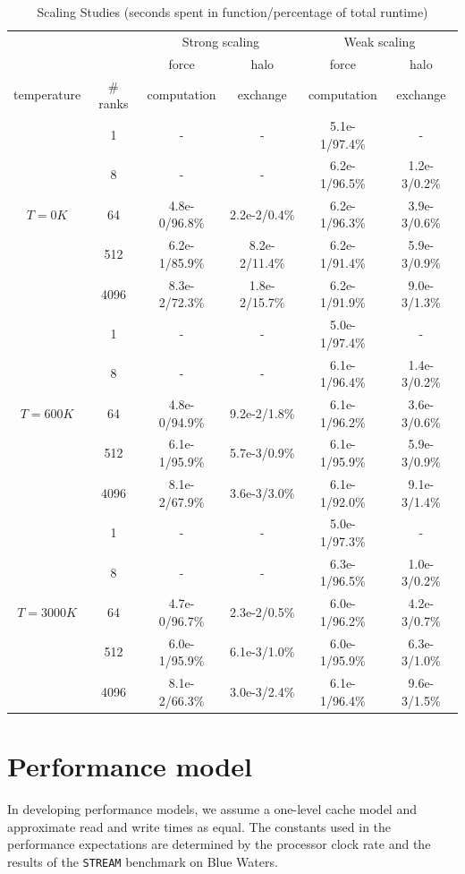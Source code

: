 \documentclass[12pt]{article}
\begin{document}
\begin{table}[h!]
\centering
\begin{tabular}{c c | c c | c c}
\toprule
& \multicolumn{1}{c}{} & \multicolumn{2}{c}{Strong scaling} & \multicolumn{2}{c}{Weak scaling} \\
\cmidrule(r){3-4} \cmidrule(r){5-6}
\multicolumn{1}{c}{} & \multicolumn{1}{c}{}  & \multicolumn{1}{c}{force} & \multicolumn{1}{c}{halo} & \multicolumn{1}{c}{force} & \multicolumn{1}{c}{halo} \\
\multicolumn{1}{c}{temperature} & \multicolumn{1}{c}{\# ranks} & \multicolumn{1}{c}{computation} & \multicolumn{1}{c}{exchange} & \multicolumn{1}{c}{computation} & \multicolumn{1}{c}{exchange} \\
\midrule
 & 1 & - & - & 5.1e-1/97.4\% & - \\ 
& 8 & - & - & 6.2e-1/96.5\% & 1.2e-3/0.2\% \\ 
$T = 0 K$ & 64 & 4.8e-0/96.8\% & 2.2e-2/0.4\% & 6.2e-1/96.3\% & 3.9e-3/0.6\% \\ 
& 512 & 6.2e-1/85.9\% & 8.2e-2/11.4\% & 6.2e-1/91.4\% & 5.9e-3/0.9\% \\ 
& 4096 & 8.3e-2/72.3\% & 1.8e-2/15.7\% & 6.2e-1/91.9\% & 9.0e-3/1.3\% \\ 
\midrule
 & 1 & - & - & 5.0e-1/97.4\% & - \\ 
& 8 & - & - & 6.1e-1/96.4\% & 1.4e-3/0.2\% \\ 
$T = 600 K$ & 64 & 4.8e-0/94.9\% & 9.2e-2/1.8\% & 6.1e-1/96.2\% & 3.6e-3/0.6\% \\ 
& 512 & 6.1e-1/95.9\% & 5.7e-3/0.9\% & 6.1e-1/95.9\% & 5.9e-3/0.9\% \\ 
& 4096 & 8.1e-2/67.9\% & 3.6e-3/3.0\% & 6.1e-1/92.0\% & 9.1e-3/1.4\% \\ 
\midrule
 & 1 & - & - & 5.0e-1/97.3\% & - \\ 
& 8 & - & - & 6.3e-1/96.5\% & 1.0e-3/0.2\% \\ 
$T = 3000 K$ & 64 & 4.7e-0/96.7\% & 2.3e-2/0.5\% & 6.0e-1/96.2\% & 4.2e-3/0.7\% \\ 
& 512 & 6.0e-1/95.9\% & 6.1e-3/1.0\% & 6.0e-1/95.9\% & 6.3e-3/1.0\% \\ 
& 4096 & 8.1e-2/66.3\% & 3.0e-3/2.4\% & 6.1e-1/96.4\% & 9.6e-3/1.5\% \\ 
\bottomrule
\end{tabular}
\caption{Scaling Studies (seconds spent in function/percentage of total runtime)}
\label{tbl:times}
\end{table}

\section{Performance model}
In developing performance models, we assume a one-level cache model and
approximate read and write times as equal.  The constants used in the
performance expectations are determined by the processor clock rate
and the results of the \texttt{STREAM} benchmark on Blue Waters.
\\
\end{document}

